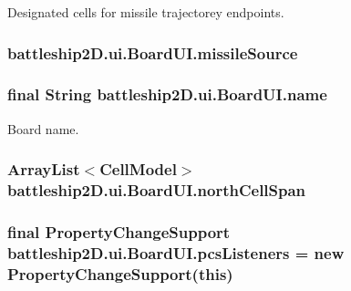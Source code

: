 Designated cells for missile trajectorey endpoints. 

\hypertarget{classbattleship2D_1_1ui_1_1BoardUI_a0362784460b94e92144f6dc02dcefc19}{
\subsubsection[{missile\-Source}]{ battleship2\-D.\-ui.\-Board\-U\-I.\-missile\-Source\hspace{0.3cm}{\ttfamily [package]}}}\label{classbattleship2D_1_1ui_1_1BoardUI_a0362784460b94e92144f6dc02dcefc19}
\hypertarget{classbattleship2D_1_1ui_1_1BoardUI_a7ad8f5d72803137c6ea6bde92a667c03}{
\subsubsection[{name}]{\setlength{\rightskip}{0pt plus 5cm}final String battleship2\-D.\-ui.\-Board\-U\-I.\-name\hspace{0.3cm}{\ttfamily [private]}}}\label{classbattleship2D_1_1ui_1_1BoardUI_a7ad8f5d72803137c6ea6bde92a667c03}


Board name. 

\hypertarget{classbattleship2D_1_1ui_1_1BoardUI_a63fa6a70d952f7fa9daff2cc57682c46}{
\subsubsection[{north\-Cell\-Span}]{\setlength{\rightskip}{0pt plus 5cm}Array\-List$<${\bf Cell\-Model}$>$ battleship2\-D.\-ui.\-Board\-U\-I.\-north\-Cell\-Span\hspace{0.3cm}{\ttfamily [package]}}}\label{classbattleship2D_1_1ui_1_1BoardUI_a63fa6a70d952f7fa9daff2cc57682c46}
\hypertarget{classbattleship2D_1_1ui_1_1BoardUI_a7ef95a87641c7018a8ff78e9a0a5ab3a}{
\subsubsection[{pcs\-Listeners}]{\setlength{\rightskip}{0pt plus 5cm}final Property\-Change\-Support battleship2\-D.\-ui.\-Board\-U\-I.\-pcs\-Listeners = new Property\-Change\-Support(this)\hspace{0.3cm}{\ttfamily [protected]}}}\label{classbattleship2D_1_1ui_1_1BoardUI_a7ef95a87641c7018a8ff78e9a0a5ab3a}


